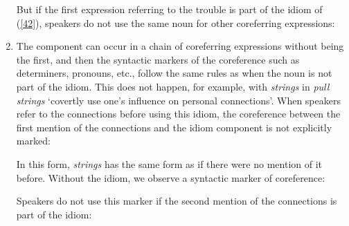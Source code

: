 \documentclass[output=paper]{langsci/langscibook}
\begin{document}
\begin{enumerate}
But if the first expression referring to the trouble is part of the idiom of (\ref{42}), speakers do not use the same noun for other coreferring expressions:

\begin{exe}
\end{exe}

\item  The component can occur in a chain of coreferring expressions without being the first, and then the syntactic markers of the coreference such as determiners, pronouns, etc., follow the same rules as when the noun is not part of the idiom. This does not happen, for example, with \textit{strings} in \textit{pull strings} ‘covertly use one’s influence on personal connections’. When speakers refer to the connections before using this idiom, the coreference between the first mention of the connections and the idiom component is not explicitly marked:

\begin{exe}
\end{exe}

In this form, \textit{strings} has the same form as if there were no mention of it before. Without the idiom, we observe a syntactic marker of coreference:

\begin{exe}
\end{exe}


Speakers do not use this marker if the second mention of the connections is part of the idiom:

\begin{exe}
\end{exe}

\end{enumerate}
\end{document}

